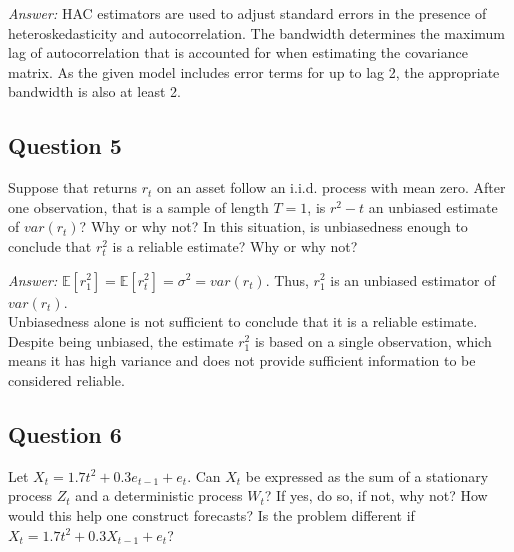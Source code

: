 \begin{footnotesize}
    \textit{Answer:} HAC estimators are used to adjust standard errors in the presence of heteroskedasticity and autocorrelation. The bandwidth determines the maximum lag of autocorrelation that is accounted for when estimating the covariance matrix. As the given model includes error terms for up to lag 2, the appropriate bandwidth is also at least 2.
\end{footnotesize}

\subsection*{Question 5}

Suppose that returns $r_t$ on an asset follow an i.i.d. process with mean zero. After one observation, that is a sample of length $T=1$, is $r^2-t$ an unbiased estimate of $var(r_t)$? Why or why not? In this situation, is unbiasedness enough to conclude that $r_t^2$ is a reliable estimate? Why or why not? \\

\begin{footnotesize}
    \textit{Answer:} $\mathbb{E}[r_1^2] = \mathbb{E}[r_t^2] = \sigma^2 = var(r_t)$. Thus, $r_1^2$ is an unbiased estimator of $var(r_t)$. \\

    Unbiasedness alone is not sufficient to conclude that it is a reliable estimate. Despite being unbiased, the estimate $r_1^2$ is based on a single observation, which means it has high variance and does not provide sufficient information to be considered reliable. 
\end{footnotesize}

\subsection*{Question 6}

Let $X_t = 1.7t^2 + 0.3 e_{t-1} + e_t$. Can $X_t$ be expressed as the sum of a stationary process $Z_t$ and a deterministic process $W_t$? If yes, do so, if not, why not? How would this help one construct forecasts? Is the problem different if $X_t = 1.7t^2 + 0.3X_{t-1} + e_t$? \\

